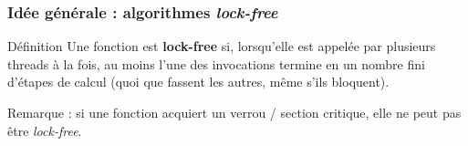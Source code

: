 \documentclass[xcolor={x11names,svgnames},x11names,svgnames]{beamer}
\begin{document}
\begin{frame}[label=lock-free-defs]
  \frametitle{Idée générale : algorithmes \emph{lock-free}}

  \begin{block}{Définition}
    Une fonction est \textbf{lock-free} si, lorsqu'elle est appelée par plusieurs
    threads à la fois, au moins l'une des invocations termine en un nombre fini
    d'étapes de calcul (quoi que fassent les autres, même s'ils bloquent).
  \end{block}

  \bigskip
  
  Remarque : si une fonction acquiert un verrou / section critique, elle ne peut
  pas être \emph{lock-free}.

  \pause\bigskip
  

\end{frame}

\end{document}
